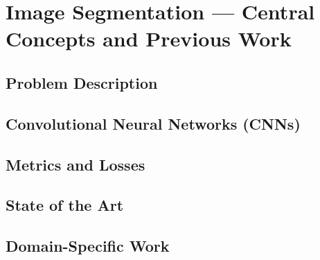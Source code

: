 \section{Image Segmentation --- Central Concepts and Previous Work}


\subsection{Problem Description}%
\label{sec:segmentation-description}


\subsection{Convolutional Neural Networks (CNNs)}%
\label{sec:cnn}
  
  
  
  
  

\subsection{Metrics and Losses}%
\label{sec:segmentation-metrics}

  

  

  

  

  

\subsection{State of the Art}%
\label{sec:cnn-architectures}

\subsection{Domain-Specific Work}%
\label{sec:remote-sensing-research}
